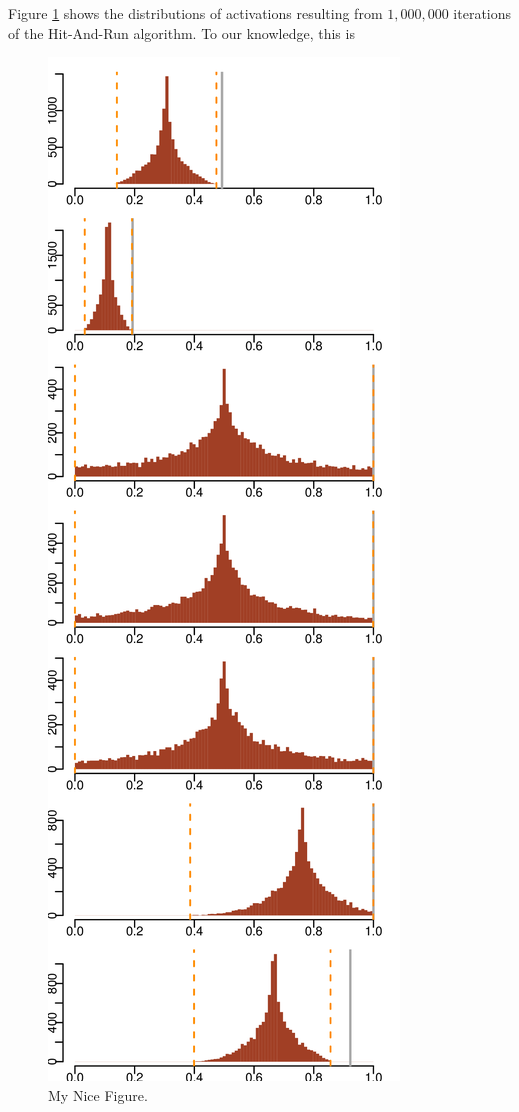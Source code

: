 
Figure \ref{fig:raw_histograms} shows the distributions of activations resulting from $1,000,000$ iterations of the Hit-And-Run algorithm. To our knowledge, this is 

\begin{figure}[htbp]
\centering
\includegraphics[width=7.5cm\textwidth]{sections/figs/raw_histograms.png}
\caption{My Nice Figure.}
\label{fig:raw_histograms}
\end{figure}
